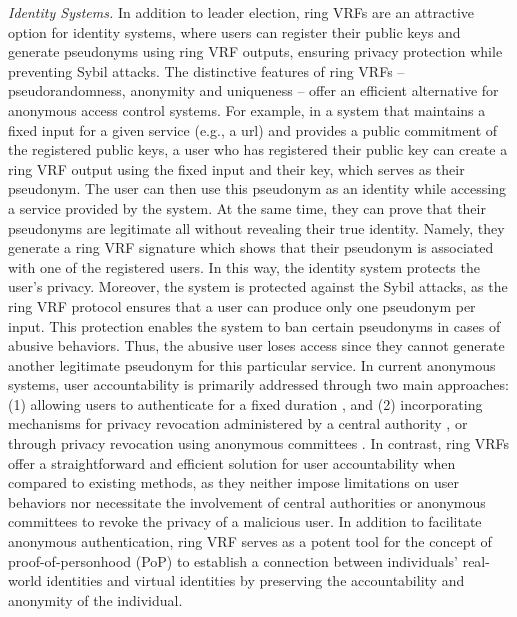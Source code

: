 \emph{Identity Systems.} In addition to leader election, ring VRFs are an attractive option for identity systems, where users can register their public keys and generate pseudonyms using ring VRF outputs, ensuring privacy protection while preventing Sybil attacks.  The distinctive features of ring VRFs -- pseudorandomness, anonymity and uniqueness -- offer an efficient alternative for anonymous access control systems. For example, in a system that maintains a fixed input for a given service (e.g., a url) and provides a public commitment of the registered public keys, a user who has registered their public key can create a ring VRF output using the fixed input and their key, which serves as their pseudonym.  The user can then use this pseudonym as an identity while accessing a service provided by the system. At the same time, they can prove that their pseudonyms  are  legitimate  all without revealing their true identity. Namely, they generate a ring VRF signature which shows that their pseudonym is associated with one of the registered users. In this way, the identity system protects the user's  privacy. Moreover, the  system is protected against the Sybil attacks, as the ring VRF protocol ensures that a user can produce only one pseudonym per input. 
This protection enables the system to ban certain pseudonyms in cases of abusive behaviors. Thus, the abusive user loses access since they cannot generate  another legitimate pseudonym for this particular service.
In current anonymous systems, user accountability is primarily addressed through two main approaches: (1) allowing users to authenticate for a fixed duration \cite{limited_authentication1,limited_authentication2,limited_authentication3}, and (2) incorporating mechanisms for privacy revocation administered by a central authority \cite{revocation1,revocation2,revocation3,revocation4}, or through privacy revocation using anonymous committees \cite{anonymous-committee1,anonymous-committee2}.
In contrast, ring VRFs offer a straightforward and efficient solution for user accountability when compared to existing methods, as they neither impose limitations on user behaviors nor necessitate the involvement of central authorities or anonymous committees to revoke the privacy of a malicious user.
In addition to facilitate anonymous authentication, ring VRF  serves as a potent tool for the concept of proof-of-personhood (PoP) \cite{pop2008,pop2017,pop2020} to establish a connection between individuals' real-world identities and virtual identities by preserving the accountability and anonymity of the individual.
